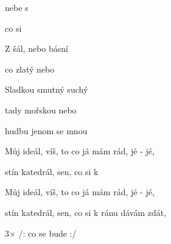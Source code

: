 

\zs
{}   nebe s     

   co si  

Z  šál,  nebo básní    

   
\ks

\zr
{} co  zlatý  nebo 

Sladkou  smutný  suchý 

 tady  mořskou  nebo 

hudbu  jenom  se mnou   
\kr

\zs
Můj ideál, víš, to co já mám rád, jé - jé,

stín katedrál, sen, co si k   
\ks

\zr\kr

\zs
Můj ideál, víš, to co já mám rád, jé - jé,

stín katedrál, sen, co si k ránu dávám zdát,

3× /:  co se  bude  :/
\ks

\kp
